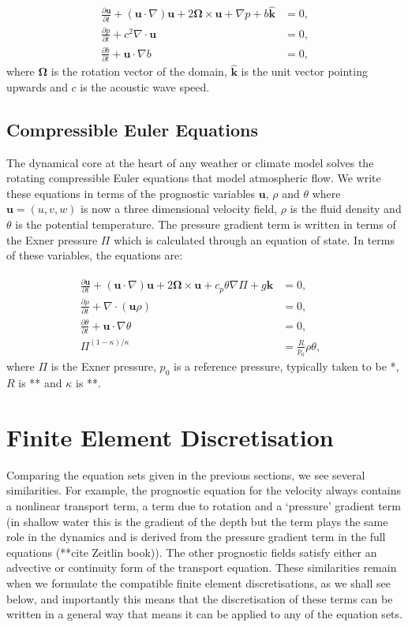 \documentclass[journal abbreviation, manuscript]{copernicus}
\def\MM#1{\boldsymbol{#1}}
\newcommand{\pp}[2]{\frac{\partial #1}{\partial #2}}
\begin{document}
\begin{align}
  \pp{\MM{u}}{t} + 
  (\MM{u}\cdot\nabla)\MM{u} +
  2\MM{\Omega}\times \MM{u} + \nabla p + b\hat{\MM{k}} & = 0, \\
  \pp{p}{t} + c^2\nabla\cdot\MM{u} & = 0, \\
  \pp{b}{t} + \MM{u}\cdot\nabla b & = 0,
\end{align}
where $\MM{\Omega}$ is the rotation vector of the domain,
$\hat{\MM{k}}$ is the unit vector pointing upwards and $c$ is the
acoustic wave speed.

\subsection{Compressible Euler Equations}
The dynamical core at the heart of any weather or climate model solves
the rotating compressible Euler equations that model atmospheric
flow. We write these equations in terms of the prognostic variables
$\MM{u}$, $\rho$ and $\theta$ where $\MM{u}=(u, v, w)$ is now a three
dimensional velocity field, $\rho$ is the fluid density and $\theta$
is the potential temperature. The pressure gradient term is written in
terms of the Exner pressure $\Pi$ which is calculated through an
equation of state. In terms of these variables, the equations are:

\begin{align}
  \pp{\MM{u}}{t} + 
  (\MM{u}\cdot\nabla)\MM{u} +
  2\MM{\Omega}\times \MM{u} + c_p\theta\nabla \Pi + g\hat{\MM{k}} & = 0, \\
  \pp{\rho}{t} + \nabla\cdot(\MM{u}\rho) & = 0, \\
  \pp{\theta}{t} + \MM{u}\cdot\nabla\theta & = 0, \\
  \Pi^{(1-\kappa)/\kappa} & = \frac{R}{p_0}\rho\theta, & 
\end{align}
where $\Pi$ is the Exner pressure, $p_0$ is a reference pressure,
typically taken to be *, $R$ is ** and $\kappa$ is **.

\section{Finite Element Discretisation}
\label{sec: FEM}

Comparing the equation sets given in the previous sections, we see
several similarities. For example, the prognostic equation for the
velocity always contains a nonlinear transport term, a term due to
rotation and a `pressure' gradient term (in shallow water this is the
gradient of the depth but the term plays the same role in the dynamics
and is derived from the pressure gradient term in the full equations
(**cite Zeitlin book)). The other prognostic fields satisfy either an
advective or continuity form of the transport equation. These
similarities remain when we formulate the compatible finite element
discretisations, as we shall see below, and importantly this means
that the discretisation of these terms can be written in a general way
that means it can be applied to any of the equation sets.
\end{document}
